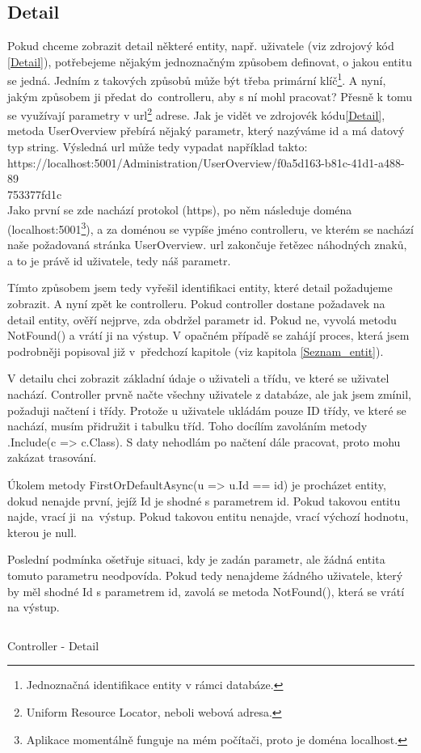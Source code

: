 \documentclass[a4paper, 12pt]{report}
\begin{document}
	\subsection{Detail} \label{Deail}
	Pokud chceme zobrazit detail některé entity, např. uživatele (viz zdrojový kód \ref{Detail}), potřebejeme nějakým jednoznačným způsobem definovat, o jakou entitu se jedná. Jedním z takových způsobů může být třeba primární klíč\footnote{Jednoznačná identifikace entity v rámci databáze.}. A nyní, jakým způsobem ji předat do~controlleru, aby s ní mohl pracovat? Přesně k tomu se využívají parametry v url\footnote{Uniform Resource Locator, neboli webová adresa.} adrese. Jak je vidět ve zdrojovék kódu\ref{Detail}, metoda UserOverview přebírá nějaký parametr, který nazýváme id a má datový typ string. Výsledná url může tedy vypadat například takto: \\
	https://localhost:5001/Administration/UserOverview/f0a5d163-b81c-41d1-a488-89\\753377fd1c\\
	Jako první se zde nachází protokol (https), po něm následuje doména (localhost:5001\footnote{Aplikace momentálně funguje na mém počítači, proto je doména localhost.}), a za doménou se vypíše jméno controlleru, ve kterém se nachází naše požadovaná stránka UserOverview. url zakončuje řetězec náhodných znaků, a to je právě id uživatele, tedy náš parametr.\par
	Tímto způsobem jsem tedy vyřešil identifikaci entity, které detail požadujeme zobrazit. A nyní zpět ke controlleru. Pokud controller dostane požadavek na detail entity, ověří nejprve, zda obdržel parametr id. Pokud ne, vyvolá metodu NotFound() a vrátí ji na výstup. V opačném případě se zahájí proces, která jsem podrobněji popisoval již v~předchozí kapitole (viz kapitola \ref{Seznam_entit}).\par
	V detailu chci zobrazit základní údaje o uživateli a třídu, ve které se uživatel nachází. Controller prvně načte všechny uživatele z databáze, ale jak jsem zmínil, požaduji načtení i třídy. Protože u uživatele ukládám pouze ID třídy, ve které se nachází, musím přidružit i tabulku tříd. Toho docílím zavoláním metody .Include(c => c.Class). S daty nehodlám po načtení dále pracovat, proto mohu zakázat trasování.\par
	Úkolem metody FirstOrDefaultAsync(u => u.Id == id) je procházet entity, dokud nenajde první, jejíž Id je shodné s parametrem id. Pokud takovou entitu najde, vrací ji~na~výstup. Pokud takovou entitu nenajde, vrací výchozí hodnotu, kterou je null.\par
	Poslední podmínka ošetřuje situaci, kdy je zadán parametr, ale žádná entita tomuto parametru neodpovída. Pokud tedy nenajdeme žádného uživatele, který by měl shodné Id s parametrem id, zavolá se metoda NotFound(), která se vrátí na výstup.
	\begin{listing}[H]
		\inputminted{csharp}{SourceCode/Controllers/Detail.cs}
		\caption{Controller - Detail}
		\label{Detail}
	\end{listing}
\end{document}
